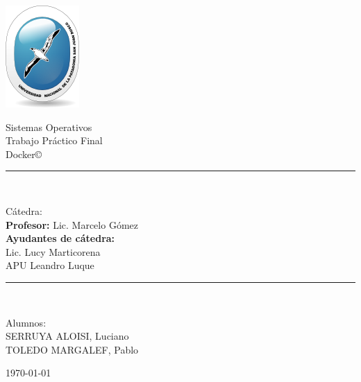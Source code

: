 \documentclass[14pt]{extarticle}
\newcommand{\fecha}{\today}
\newcommand{\docker}{Docker\copyright}
\begin{document}
    \begin{titlepage}

        \begin{center}
            \includegraphics{logoUnpsjb.png}
            \linebreak
            \begin{huge}
                Sistemas Operativos \\ Trabajo Práctico Final \\ \docker{}\\
            \end{huge}
            \vspace*{5mm}
            \rule{10cm}{0.1mm}\\
            \vspace*{3mm}
            \begin{Large}
                Cátedra:\\
                \textbf{Profesor:} Lic. Marcelo Gómez\\
                \vspace*{5mm}
                \textbf{Ayudantes de cátedra:}\\ Lic. Lucy Marticorena\\APU Leandro Luque\\
            \end{Large}
            \vspace*{3mm}
            \rule{10cm}{0.1mm}\\
            \vspace*{5mm}
            \begin{large}
                Alumnos:\\
                SERRUYA ALOISI, Luciano\\
                TOLEDO MARGALEF, Pablo\\
            \end{large}
            \vspace*{5mm}
            \Large\fecha
    \end{center}

    \end{titlepage}
\end{document}
